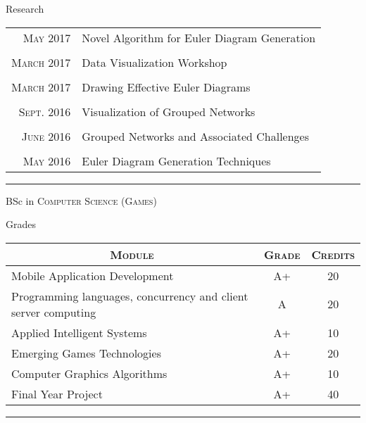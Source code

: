 \documentclass[a4paper,10pt]{article} %
\begin{document}
\pagebreak


\par{\centering\Large \hypertarget{papers}{Research}\par}

\begin{center}
\begin{tabular}{rl}
\textsc{May} 2017 & Novel Algorithm for Euler Diagram Generation \\
\\
\textsc{March} 2017 & Data Visualization Workshop \\
\\
\textsc{March} 2017 & Drawing Effective Euler Diagrams \\
\\
\textsc{Sept.} 2016 & Visualization of Grouped Networks \\
\\
\textsc{June} 2016 & Grouped Networks and Associated Challenges \\
\\
\textsc{May} 2016 & Euler Diagram Generation Techniques \\
\end{tabular}
\end{center}
\bigskip
\hrule
\vspace{1cm}


\par{\centering\Large \hypertarget{grds}{BSc in \textsc{Computer Science (Games)}}\par}\large{\centering Grades\par}\normalsize

\begin{center}
\begin{tabular}{lcc}
\multicolumn{1}{c}{\textsc{Module}} & \textsc{Grade}&\textsc{Credits}\\ \hline
Mobile Application Development                                  & A+ & 20\\
Programming languages, concurrency and client server computing  & A & 20\\
Applied Intelligent Systems                                     & A+ & 10\\
Emerging Games Technologies                                     & A+ & 20\\
Computer Graphics Algorithms                                    & A+ & 10\\
Final Year Project                                              & A+ & 40\\
\end{tabular}
\end{center}
\bigskip
\hrule
\vspace{1cm}
\end{document}
